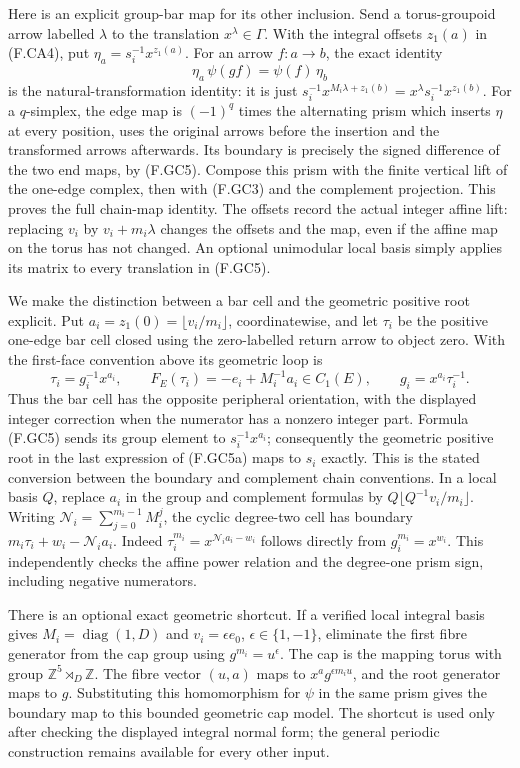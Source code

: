Here is an explicit group-bar map for its other inclusion.
Send a torus-groupoid arrow labelled $\lambda$ to the
translation $x^\lambda\in\Gamma$.  With the integral offsets
$z_1(a)$ in (F.CA4), put
$\eta_a=s_i^{-1}x^{z_1(a)}$.
For an arrow $f:a\to b$, the exact identity
\[
 \eta_a\,\psi(gf)=\psi(f)\,\eta_b                        \tag{F.GC5}
\]
is the natural-transformation identity: it is just
$s_i^{-1}x^{M_i\lambda+z_1(b)}
 =x^\lambda s_i^{-1}x^{z_1(b)}$.
For a $q$-simplex, the edge map is $(-1)^q$ times the
alternating prism which inserts $\eta$ at every position,
uses the original arrows before the insertion and the
transformed arrows afterwards.  Its boundary is precisely
the signed difference of the two end maps, by (F.GC5).
Compose this prism with the finite vertical lift of the
one-edge complex, then with (F.GC3) and the complement
projection.  This proves the full chain-map identity.
The offsets record the actual integer affine lift: replacing
$v_i$ by $v_i+m_i\lambda$ changes the offsets and the map,
even if the affine map on the torus has not changed.
An optional unimodular local basis simply applies its matrix
to every translation in (F.GC5).

We make the distinction between a bar cell and the geometric
positive root explicit.  Put
$a_i=z_1(0)=\lfloor v_i/m_i\rfloor$, coordinatewise, and
let $\tau_i$ be the positive one-edge bar cell closed using
the zero-labelled return arrow to object zero.  With the
first-face convention above its geometric loop is
\[
 \tau_i=g_i^{-1}x^{a_i},\qquad
 F_E(\tau_i)=-e_i+M_i^{-1}a_i\in C_1(E),\qquad
 g_i=x^{a_i}\tau_i^{-1}.                                  \tag{F.GC5a}
\]
Thus the bar cell has the opposite peripheral orientation,
with the displayed integer correction when the numerator
has a nonzero integer part.  Formula (F.GC5) sends its
group element to $s_i^{-1}x^{a_i}$; consequently the
geometric positive root in the last expression of (F.GC5a)
maps to $s_i$ exactly.  This is the stated conversion between
the boundary and complement chain conventions.  In a local basis
$Q$, replace $a_i$ in the group and complement formulas by
$Q\lfloor Q^{-1}v_i/m_i\rfloor$.
Writing $\mathcal N_i=\sum_{j=0}^{m_i-1}M_i^j$, the cyclic
degree-two cell has boundary
$m_i\tau_i+w_i-\mathcal N_i a_i$.
Indeed $\tau_i^{m_i}=x^{\mathcal N_i a_i-w_i}$ follows
directly from $g_i^{m_i}=x^{w_i}$.
This independently checks the affine power relation and
the degree-one prism sign, including negative numerators.

There is an optional exact geometric shortcut.  If a verified
local integral basis gives $M_i=\operatorname{diag}(1,D)$ and
$v_i=\epsilon e_0$, $\epsilon\in\{1,-1\}$, eliminate the
first fibre generator from the cap group using
$g^{m_i}=u^\epsilon$.  The cap is the mapping torus with
group $\mathbb Z^5\rtimes_D\mathbb Z$.
The fibre vector $(u,a)$ maps to $x^a g^{\epsilon m_i u}$,
and the root generator maps to $g$.  Substituting this
homomorphism for $\psi$ in the same prism gives the boundary
map to this bounded geometric cap model.  The shortcut is
used only after checking the displayed integral normal form;
the general periodic construction remains available for
every other input.

